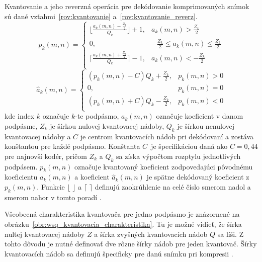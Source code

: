   Kvantovanie a jeho reverzná operácia pre dekódovanie komprimovaných snímok sú dané vzťahmi~{\ref{rov:kvantovanie}} a~{\ref{rov:kvantovanie_reverz}}.
  \begin{equation}
    p_k(m,n) =
    \begin{cases}
      \lfloor \frac{a_k(m,n) - \frac{Z_k}{2}}{Q_k} \rfloor + 1, & a_k(m,n) > \frac{Z_k}{2} \\
      0, & -\frac{Z_k}{2} \leq a_k(m,n) \leq \frac{Z_k}{2} \\
      \lceil \frac{a_k(m,n) + \frac{Z_k}{2} }{Q_k} \rceil - 1, & a_k(m,n) < -\frac{Z_k}{2} \\
    \end{cases}
    \label{rov:kvantovanie}
  \end{equation}
  \begin{equation}
    \hat{a}_k(m,n) = 
    \begin{cases}
      (p_k(m,n) - C)Q_k + \frac{Z_k}{2}, & p_k(m,n) > 0 \\
      0, & p_k(m,n) = 0 \\
      (p_k(m,n) + C)Q_k - \frac{Z_k}{2}, & p_k(m,n) < 0\\
    \end{cases}
    \label{rov:kvantovanie_reverz}
  \end{equation}
  kde index $k$ označuje $k$-te podpásmo, $a_k(m,n)$ označuje koeficient v danom podpásme, $Z_k$ je šírkou nulovej kvantovacej nádoby,
  $Q_k$ je šírkou nenulovej kvantovacej nádoby a $C$ je centrom kvantovacích nádob pri dekódovaní a zostáva konštantou pre každé podpásmo. Konštanta
  {$C$}~je špecifikáciou daná ako $C = 0,44$ pre najnovší kodér, pričom $Z_k$ a $Q_k$ sa získa výpočtom rozptylu jednotlivých podpásem. $p_k(m,n)$ označuje
  kvantovaný koeficient zodpovedajúci pôvodnému koeficientu $a_k(m,n)$ a koeficient $\hat{a}_k(m,n)$ je spätne dekódovaný koeficient z~{$p_k(m,n)$}.
  Funkcie $\lfloor$ $\rfloor$ a $\lceil$ $\rceil$ definujú zaokrúhlenie na celé číslo smerom nadol a smerom nahor v tomto poradí \cite{WSQSpecification}.

  Všeobecná charakteristika kvantovača pre jedno podpásmo je znázornené na obrázku~{\ref{obr:wsq_kvantovacia_charakteristika}}. Tu je možné vidieť, že šírka
  nultej kvantovacej nádoby $Z$ a šírka zvyšných kvantovacích nádob $Q$ sa líši. Z tohto dôvodu je nutné definovať dve rôzne šírky nádob pre jeden kvantovač.
  Šírky kvantovacích nádob sa definujú špecificky pre danú snímku pri kompresii \cite{brislawn1996compression}.

